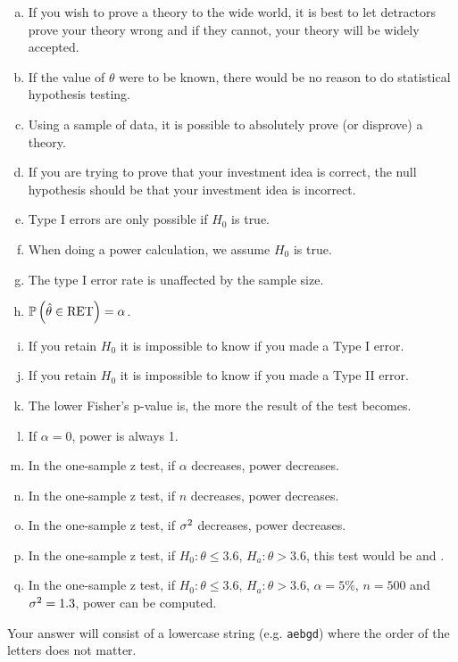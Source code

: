 \documentclass[12pt,landscape]{article}
\newcommand{\instr}{\small Your answer will consist of a lowercase string (e.g. \texttt{aebgd}) where the order of the letters does not matter. \normalsize}
\begin{document}
\begin{enumerate}[(a)]
\item If you wish to prove a theory to the wide world, it is best to let detractors prove your theory wrong and if they cannot, your theory will be widely accepted.
\item If the value of $\theta$ were to be known, there would be no reason to do statistical hypothesis testing.
\item Using a sample of data, it is possible to absolutely prove (or disprove) a theory.
\item If you are trying to prove that your investment idea is correct, the null hypothesis should be that your investment idea is incorrect.
\item Type I errors are only possible if $H_0$ is true.
\item When doing a power calculation, we assume $H_0$ is true.
\item The type I error rate is unaffected by the sample size.
\item $\mathbb{P}\left(\hat{\theta} \in \text{RET}\right) = \alpha$.
\item If you retain $H_0$ it is impossible to know if you made a Type I error.
\item If you retain $H_0$ it is impossible to know if you made a Type II error.
\item The lower Fisher's p-value is, the more  the result of the test becomes.
\item If $\alpha = 0$, power is always 1.
\item In the one-sample z test, if $\alpha$ decreases, power decreases.
\item In the one-sample z test, if $n$ decreases, power decreases.
\item In the one-sample z test, if $\sigma^2$ decreases, power decreases.
\item In the one-sample z test, if $H_0: \theta \leq 3.6$, $H_a: \theta > 3.6$, this test would be  and .
\item In the one-sample z test, if $H_0: \theta \leq 3.6$, $H_a: \theta > 3.6$, $\alpha = 5\%$, $n=500$ and $\sigma^2 = 1.3$, power can be computed.
\end{enumerate}
\eenum\instr\pagebreak
\end{document}
